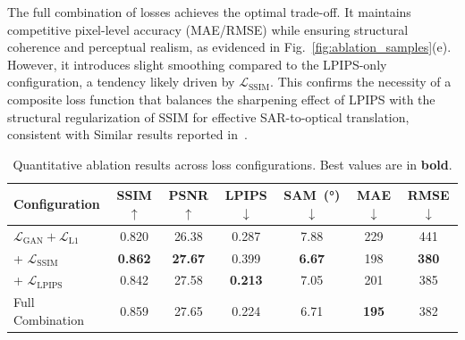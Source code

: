 The full combination of losses achieves the optimal trade-off. It maintains competitive pixel-level accuracy (MAE/RMSE) while ensuring structural coherence and perceptual realism, as evidenced in Fig.~\ref{fig:ablation_samples}(e). However, it introduces slight smoothing compared to the LPIPS-only configuration, a tendency likely driven by $\mathcal{L}_{\text{SSIM}}$. This confirms the necessity of a composite loss function that balances the sharpening effect of LPIPS with the structural regularization of SSIM for effective SAR-to-optical translation, consistent with Similar results reported in~\cite{s2o_ViT_cGAN, CR_RS_GAN_s2o}.

\begin{table}[!htbp]
    \centering
    \caption{Quantitative ablation results across loss configurations. Best values are in \textbf{bold}.}
    \label{tab:ablation_quantitative}
        \begin{tabular}{lcccccc}
            \toprule
            \textbf{Configuration} & \textbf{SSIM $\uparrow$} & \textbf{PSNR $\uparrow$} & \textbf{LPIPS $\downarrow$} & \textbf{SAM~(°) $\downarrow$} & \textbf{MAE $\downarrow$} & \textbf{RMSE $\downarrow$} \\
            \midrule
            $\mathcal{L}_{\text{GAN}} + \mathcal{L}_{\text{L1}}$ & 0.820 & 26.38 & 0.287 & 7.88 & 229 & 441 \\
            + $\mathcal{L}_{\text{SSIM}}$ & \textbf{0.862} & \textbf{27.67} & 0.399 & \textbf{6.67} & 198 & \textbf{380} \\
            + $\mathcal{L}_{\text{LPIPS}}$ & 0.842 & 27.58 & \textbf{0.213} & 7.05 & 201 & 385 \\
            Full Combination & 0.859 & 27.65 & 0.224 & 6.71 & \textbf{195} & 382 \\
            \bottomrule
        \end{tabular}%
\end{table}

